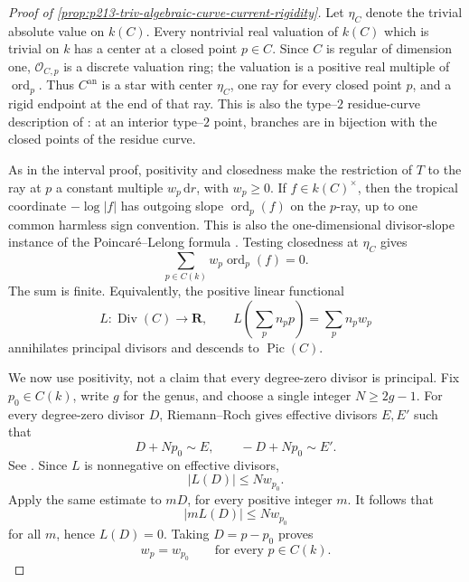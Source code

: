 \begin{proof}[Proof of
\cref{prop:p213-triv-algebraic-curve-current-rigidity}]
Let \(\eta_C\) denote the trivial absolute value on \(k(C)\).  Every
nontrivial real valuation of \(k(C)\) which is trivial on \(k\) has a center
at a closed point \(p\in C\).  Since \(C\) is regular of dimension one,
\(\mathcal O_{C,p}\) is a discrete valuation ring; the valuation is a
positive real multiple of \(\operatorname{ord}_p\).  Thus
\(C^{\mathrm{an}}\) is a star with center \(\eta_C\), one ray for every
closed point \(p\), and a rigid endpoint at the end of that ray.  This is
also the type--\(2\) residue-curve description of
\cite[\S3.3.5.2, Theorem~4.2.10 and \S4.2.11.1]
{Ducros24CurveStructure}: at an interior type--\(2\) point, branches are in
bijection with the closed points of the residue curve.

As in the interval proof, positivity and closedness make the restriction
of \(T\) to the ray at \(p\) a constant multiple \(w_p\,\mathrm dr\), with
\(w_p\geq0\).  If \(f\in k(C)^\times\), then the tropical coordinate
\(-\log|f|\) has outgoing slope \(\operatorname{ord}_p(f)\) on the
\(p\)-ray, up to one common harmless sign convention.  This is also the
one-dimensional divisor-slope instance of the Poincar\'e--Lelong formula
\cite[Theorem~16.7.3]{CLD25}.  Testing closedness
at \(\eta_C\) gives
\begin{equation}
                       \sum_{p\in C(k)}
                       w_p\operatorname{ord}_p(f)=0.
\label{eq:p213-triv-principal-annihilation}
\end{equation}
The sum is finite.  Equivalently, the positive linear functional
\begin{equation}
      L\colon\operatorname{Div}(C)\longrightarrow\mathbf R,
      \qquad
      L\!\left(\sum_pn_pp\right)=\sum_pn_pw_p
\label{eq:p213-triv-divisor-functional}
\end{equation}
annihilates principal divisors and descends to \(\operatorname{Pic}(C)\).

We now use positivity, not a claim that every degree-zero divisor is
principal.  Fix \(p_0\in C(k)\), write \(g\) for the genus, and choose a
single integer \(N\geq2g-1\).  For every degree-zero divisor \(D\),
Riemann--Roch gives effective divisors \(E,E'\) such that
\begin{equation}
                     D+Np_0\sim E,
       \qquad       -D+Np_0\sim E'.
\label{eq:p213-triv-rr-effective}
\end{equation}
See \cite[Tag 0B90]{StacksProject}.  Since \(L\) is nonnegative on effective
divisors,
\begin{equation}
                         |L(D)|\leq Nw_{p_0}.
\label{eq:p213-triv-pic0-bound}
\end{equation}
Apply the same estimate to \(mD\), for every positive integer \(m\).  It
follows that
\[
 |mL(D)|\leq Nw_{p_0}
\]
for all \(m\), hence \(L(D)=0\).  Taking \(D=p-p_0\) proves
\begin{equation}
                              w_p=w_{p_0}
                 \qquad\text{for every }p\in C(k).
\label{eq:p213-triv-all-curve-weights}
\end{equation}


\end{proof}
